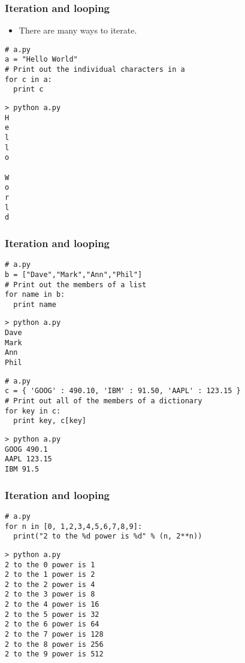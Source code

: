 \documentclass[handout]{beamer}
\numberwithin{equation}{section}
\begin{document}
\begin{frame}[fragile]
\frametitle{Iteration and looping}

\begin{itemize}
\item There are many ways to iterate.
\end{itemize}

\begin{lstlisting}[name=ex]
# a.py
a = "Hello World"
# Print out the individual characters in a 
for c in a:
  print c
\end{lstlisting}

\pause 
\begin{lstlisting}[name=ex]
> python a.py
H
e
l
l
o
 
W
o
r
l
d
\end{lstlisting}
\end{frame}


\begin{frame}[fragile]
\frametitle{Iteration and looping}

\begin{lstlisting}[name=ex]
# a.py
b = ["Dave","Mark","Ann","Phil"] 
# Print out the members of a list 
for name in b:
  print name
\end{lstlisting}

\pause
\begin{lstlisting}[name=ex]
> python a.py
Dave
Mark
Ann
Phil
\end{lstlisting}

\pause
\begin{lstlisting}[name=ex]
# a.py
c = { 'GOOG' : 490.10, 'IBM' : 91.50, 'AAPL' : 123.15 } 
# Print out all of the members of a dictionary
for key in c:
  print key, c[key]
\end{lstlisting}

\pause
\begin{lstlisting}[name=ex]
> python a.py
GOOG 490.1
AAPL 123.15
IBM 91.5
\end{lstlisting}
\end{frame}

\begin{frame}[fragile]
\frametitle{Iteration and looping}

\begin{lstlisting}[name=ex]
# a.py
for n in [0, 1,2,3,4,5,6,7,8,9]:
  print("2 to the %d power is %d" % (n, 2**n))
\end{lstlisting}

\pause

\begin{lstlisting}[name=ex]
> python a.py
2 to the 0 power is 1
2 to the 1 power is 2
2 to the 2 power is 4
2 to the 3 power is 8
2 to the 4 power is 16
2 to the 5 power is 32
2 to the 6 power is 64
2 to the 7 power is 128
2 to the 8 power is 256
2 to the 9 power is 512
\end{lstlisting}
\end{frame}
\end{document}
